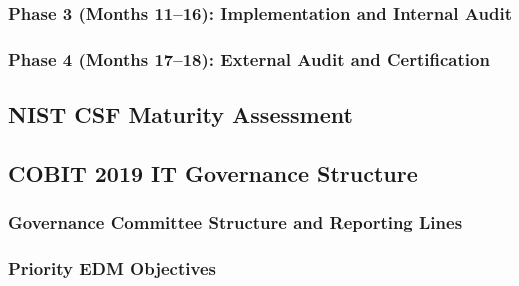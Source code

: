 
\subsubsection{Phase 3 (Months 11--16): Implementation and Internal Audit}


\subsubsection{Phase 4 (Months 17--18): External Audit and Certification}




\subsection{NIST CSF Maturity Assessment}




\subsection{COBIT 2019 IT Governance Structure}

\subsubsection{Governance Committee Structure and Reporting Lines}


\subsubsection{Priority EDM Objectives}


